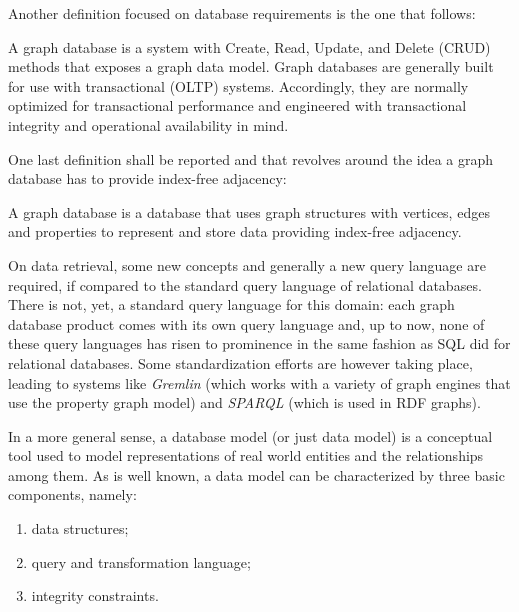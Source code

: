 Another definition focused on database requirements is the one that follows:


\begin{definition}\label{definition:ofgraphdatabaseswithrequirements}
	A graph database is a system with Create, Read, Update, and Delete (CRUD) methods that exposes a graph data model.
	Graph databases are generally built for use with transactional (OLTP) systems.
	Accordingly, they are normally optimized for transactional performance and engineered with transactional integrity and operational availability
	in mind.
\end{definition}

One last definition shall be reported and that revolves around the idea a graph database has to provide index-free adjacency:

\begin{definition}\label{definition:ofgraphdatabasesrequiringindexfreeadjacency}
	A graph database is a database that uses graph structures with vertices, edges and properties to represent and store data providing index-free adjacency.
\end{definition}

On data retrieval, some new concepts and generally a new query language are required, if compared to the standard query language of relational databases.
There is not, yet, a standard query language for this domain:
each graph database product comes with its own query language and, up to now, none of these query languages has risen to prominence in the same fashion as SQL did for relational databases.
Some standardization efforts are however taking place, leading to systems like \textit{Gremlin} (which works with a variety of graph engines that use the property graph model) and \textit{SPARQL} (which is used in RDF graphs). 

In a more general sense, a database model (or just data model) is a conceptual tool used to model representations of real world entities and the relationships among them. 
As is well known, a data model can be characterized by three basic components, namely:
 \begin{enumerate}[noitemsep]
	\item data structures;
	\item query and transformation language;
	\item integrity constraints.
\end{enumerate}

